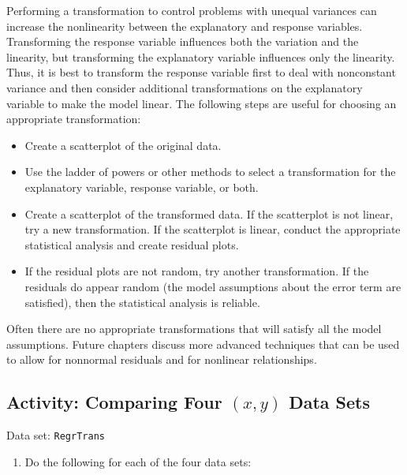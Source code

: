 \documentclass[
]{book}
\providecommand{\tightlist}{%
  \setlength{\itemsep}{0pt}\setlength{\parskip}{0pt}}
\begin{document}
Performing a transformation to control problems with unequal variances can increase the nonlinearity between the explanatory and response variables. Transforming the response variable influences both the variation and the linearity, but transforming the explanatory variable influences only the linearity. Thus, it is best to transform the response variable first to deal with nonconstant variance and then consider additional transformations on the explanatory variable to make the model linear. The following steps are useful for choosing an appropriate transformation:

\begin{itemize}
\tightlist
\item
  Create a scatterplot of the original data.
\item
  Use the ladder of powers or other methods to select a transformation for the explanatory variable, response variable, or both.
\item
  Create a scatterplot of the transformed data. If the scatterplot is not linear, try a new transformation. If the scatterplot is linear, conduct the appropriate statistical analysis and create residual plots.
\item
  If the residual plots are not random, try another transformation. If the residuals do appear random (the model assumptions about the error term are satisfied), then the statistical analysis is reliable.
\end{itemize}

Often there are no appropriate transformations that will satisfy all the model assumptions. Future chapters discuss more advanced techniques that can be used to allow for nonnormal residuals and for nonlinear relationships.

\hypertarget{activity-comparing-four-x-y-data-sets}{%
\subsection*{\texorpdfstring{Activity: Comparing Four \((x, y)\) Data Sets}{Activity: Comparing Four (x, y) Data Sets}}\label{activity-comparing-four-x-y-data-sets}}

Data set: \texttt{RegrTrans}

\begin{enumerate}
\def\labelenumi{\arabic{enumi}.}
\setcounter{enumi}{32}
\tightlist
\item
  Do the following for each of the four data sets:
\end{enumerate}
\end{document}
